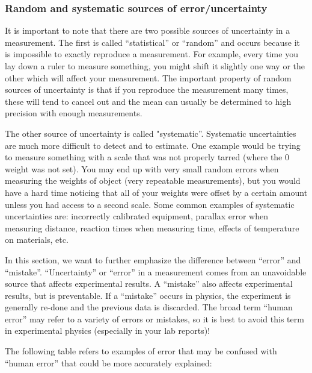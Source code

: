 \subsubsection{Random and systematic sources of error/uncertainty}
It is important to note that there are two possible sources of uncertainty in a measurement. The first is called ``statistical'' or ``random'' and occurs because it is impossible to exactly reproduce a measurement. For example, every time you lay down a ruler to measure something, you might shift it slightly one way or the other which will affect your measurement. The important property of random sources of uncertainty is that if you reproduce the measurement many times, these will tend to cancel out and the mean can usually be determined to high precision with enough measurements. 

The other source of uncertainty is called "systematic''. Systematic uncertainties are much more difficult to detect and to estimate. One example would be trying to measure something with a scale that was not properly tarred (where the 0 weight was not set). You may end up with very small random errors when measuring the weights of object (very repeatable measurements), but you would have a hard time noticing that all of your weights were offset by a certain amount unless you had access to a second scale. Some common examples of systematic uncertainties are: incorrectly calibrated equipment, parallax error when measuring distance, reaction times when measuring time, effects of temperature on materials, etc.

In this section, we want to further emphasize the difference between ``error'' and ``mistake''. ``Uncertainty'' or ``error'' in a measurement comes from an unavoidable source that affects experimental results. A ``mistake'' also affects experimental results, but is preventable. If a ``mistake'' occurs in physics, the experiment is generally re-done and the previous data is discarded. The broad term ``human error'' may refer to a variety of errors or mistakes, so it is best to avoid this term in experimental physics (especially in your lab reports)!

The following table refers to examples of error that may be confused with ``human error'' that could be more accurately explained:

